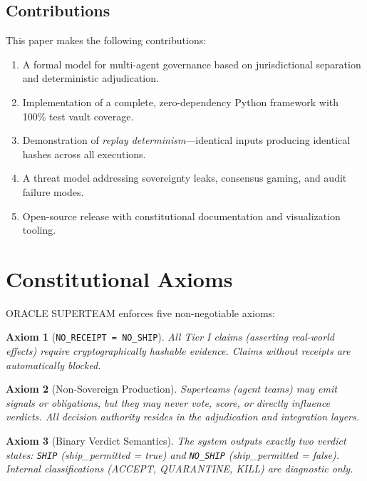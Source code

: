 \documentclass[11pt, letterpaper]{article}
\newtheorem{axiom}{Axiom}
\begin{document}
\subsection{Contributions}

This paper makes the following contributions:

\begin{enumerate}
    \item A formal model for multi-agent governance based on jurisdictional separation and deterministic adjudication.
    \item Implementation of a complete, zero-dependency Python framework with 100\% test vault coverage.
    \item Demonstration of \textit{replay determinism}—identical inputs producing identical hashes across all executions.
    \item A threat model addressing sovereignty leaks, consensus gaming, and audit failure modes.
    \item Open-source release with constitutional documentation and visualization tooling.
\end{enumerate}

\section{Constitutional Axioms}

ORACLE SUPERTEAM enforces five non-negotiable axioms:

\begin{axiom}[\texttt{NO\_RECEIPT = NO\_SHIP}]
\label{ax:no-receipt}
All Tier I claims (asserting real-world effects) require cryptographically hashable evidence. Claims without receipts are automatically blocked.
\end{axiom}

\begin{axiom}[Non-Sovereign Production]
\label{ax:non-sovereign}
Superteams (agent teams) may emit signals or obligations, but they may \textit{never} vote, score, or directly influence verdicts. All decision authority resides in the adjudication and integration layers.
\end{axiom}

\begin{axiom}[Binary Verdict Semantics]
\label{ax:binary}
The system outputs exactly two verdict states: \texttt{SHIP} (ship\_permitted = true) and \texttt{NO\_SHIP} (ship\_permitted = false). Internal classifications (ACCEPT, QUARANTINE, KILL) are diagnostic only.
\end{axiom}
\end{document}
